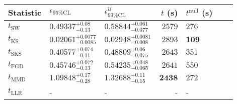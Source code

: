 \begin{tabular}{l|llr|llr}
	Statistic & $\epsilon_{95\%\mathrm{CL}}$ & $\epsilon^    {\mathcal{U}}_{99\%\mathrm{CL}}$ & $t$ (s) & $t^{\mathrm{null}}$ (s) \\
	\midrule
	$t_{\mathrm{SW}}$ & $0.49337_{-0.13}^{+0.08}$ & $0.58844_{-0.077}^{+0.061}$ & $2579$ & $276$ \\
	$t_{\overline{\mathrm{KS}}}$ & ${\mathbf{0.02061_{-0.0085}^{+0.0077}}}$ & ${\mathbf{0.02948_{-0.008}^{+0.0081}}}$ & $2893$ & ${\mathbf{109}}$ \\
	$t_{\mathrm{SKS}}$ & $0.40577_{-0.11}^{+0.074}$ & $0.48809_{-0.075}^{+0.06}$ & $2643$ & $351$ \\
	$t_{\mathrm{FGD}}$ & $0.45746_{-0.13}^{+0.072}$ & $0.54235_{-0.065}^{+0.048}$ & $2641$ & $550$ \\
	$t_{\mathrm{MMD}}$ & $1.09848_{-0.28}^{+0.17}$ & $1.32688_{-0.15}^{+0.11}$ & ${\mathbf{2438}}$ & $272$ \\
	$t_{\mathrm{LLR}}$ & - & - & - & - \\
	\bottomrule
\end{tabular}